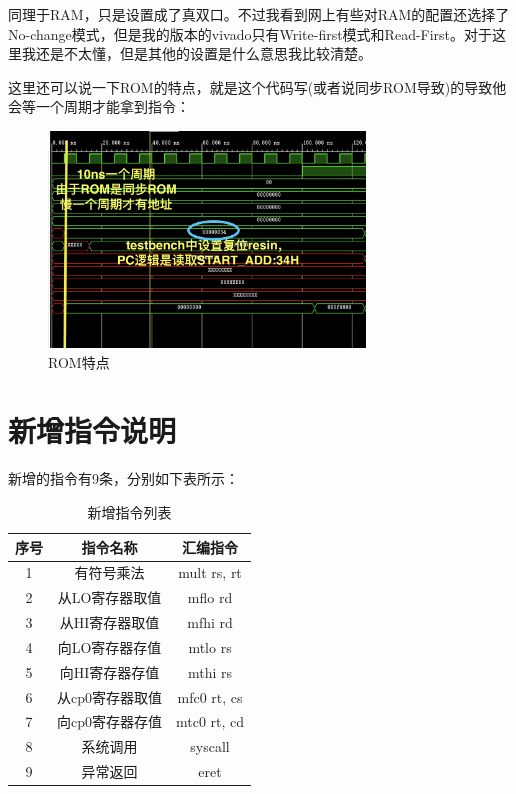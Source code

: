 \documentclass[a4paper]{article}
\begin{document}
同理于RAM，只是设置成了真双口。不过我看到网上有些对RAM的配置还选择了No-change模式，但是我的版本的vivado只有Write-first模式和Read-First。对于这里我还是不太懂，但是其他的设置是什么意思我比较清楚。


这里还可以说一下ROM的特点，就是这个代码写(或者说同步ROM导致)的导致他会等一个周期才能拿到指令：

\begin{figure}[H]
    \centering
    \includegraphics[width=0.75\textwidth]{img/复现流水线/刚进入.png}
    \caption{ROM特点}
\end{figure}

\newpage

\section{新增指令说明}


新增的指令有9条，分别如下表所示：

\begin{table}[H]
    \centering
    \begin{tabular}{ccc}
        \toprule
        序号 & 指令名称 & 汇编指令 \\
        \midrule
        1 & 有符号乘法 & mult rs, rt \\
        2 & 从LO寄存器取值 & mflo rd \\
        3 & 从HI寄存器取值 & mfhi rd \\
        4 & 向LO寄存器存值 & mtlo rs \\
        5 & 向HI寄存器存值 & mthi rs \\
        6 & 从cp0寄存器取值 & mfc0 rt, cs \\
        7 & 向cp0寄存器存值 & mtc0 rt, cd \\
        8 & 系统调用 & syscall \\
        9 & 异常返回 & eret \\
        \bottomrule
    \end{tabular}
    \caption{新增指令列表}
\end{table}
\end{document}
